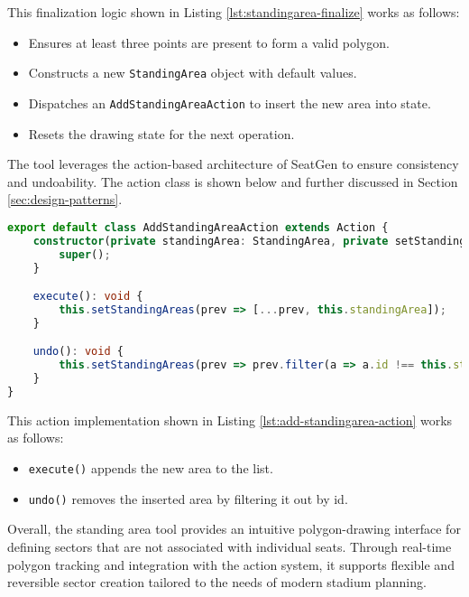 This finalization logic shown in Listing \ref{lst:standingarea-finalize} works as follows:
\begin{itemize}
    \item Ensures at least three points are present to form a valid polygon.
    \item Constructs a new \texttt{StandingArea} object with default values.
    \item Dispatches an \texttt{AddStandingAreaAction} to insert the new area into state.
    \item Resets the drawing state for the next operation.
\end{itemize}

The tool leverages the action-based architecture of SeatGen to ensure consistency and undoability. The action class is shown below and further discussed in Section \ref{sec:design-patterns}.

\begin{lstlisting}[language=TypeScript, caption=AddStandingAreaAction, label=lst:add-standingarea-action]
export default class AddStandingAreaAction extends Action {
    constructor(private standingArea: StandingArea, private setStandingAreas: React.Dispatch<React.SetStateAction<StandingArea[]>>) {
        super();
    }

    execute(): void {
        this.setStandingAreas(prev => [...prev, this.standingArea]);
    }

    undo(): void {
        this.setStandingAreas(prev => prev.filter(a => a.id !== this.standingArea.id));
    }
}
\end{lstlisting}

This action implementation shown in Listing \ref{lst:add-standingarea-action} works as follows:
\begin{itemize}
    \item \texttt{execute()} appends the new area to the list.
    \item \texttt{undo()} removes the inserted area by filtering it out by id.
\end{itemize}

Overall, the standing area tool provides an intuitive polygon-drawing interface for defining sectors that are not associated with individual seats. Through real-time polygon tracking and integration with the action system, it supports flexible and reversible sector creation tailored to the needs of modern stadium planning.
